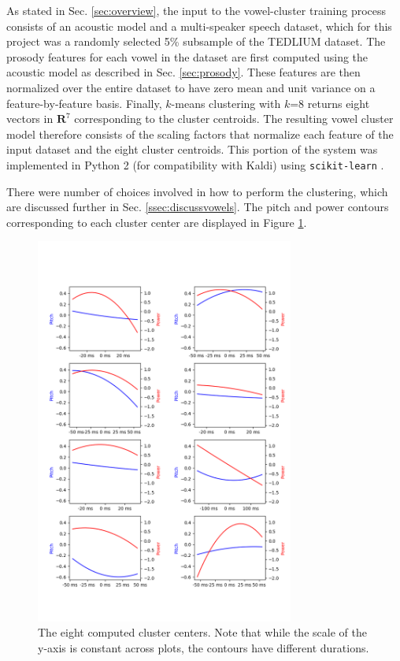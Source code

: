 \documentclass{article}
\begin{document}
As stated in Sec. \ref{sec:overview}, the input to the vowel-cluster training process consists of an acoustic model and a multi-speaker speech dataset, which for this project was a randomly selected 5\% subsample of the TEDLIUM dataset.
The prosody features for each vowel in the dataset are first computed using the acoustic model as described in Sec. \ref{sec:prosody}.
These features are then normalized over the entire dataset to have zero mean and unit variance on a feature-by-feature basis.
Finally, $k$-means clustering with $k$=8 returns eight vectors in $\mathbf{R}^7$ corresponding to the cluster centroids.
The resulting vowel cluster model therefore consists of the scaling factors that normalize each feature of the input dataset and the eight cluster centroids. This portion of the system was implemented in Python 2 (for compatibility with Kaldi) using \texttt{scikit-learn} \cite{scikit-learn}.

There were number of choices involved in how to perform the clustering, which are discussed further in Sec. \ref{ssec:discussvowels}. The pitch and power contours corresponding to each cluster center are displayed in Figure \ref{fig:clustercenters}.

\begin{figure}[htb]

\begin{minipage}[b]{1.0\linewidth}
  \centering
  \centerline{\includegraphics[width=8.5cm]{cluster_centers.png}}
\end{minipage}
\caption{The eight computed cluster centers. Note that while the scale of the y-axis is constant across plots, the contours have different durations.}
\label{fig:clustercenters}
\end{figure}
\end{document}
